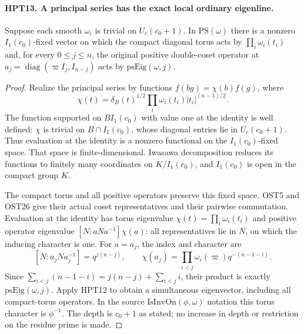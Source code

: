 \paragraph{HPT13. A principal series has the exact local ordinary eigenline.}
\label{claim:HPT13}
Suppose each smooth $\omega_i$ is trivial on $U_c(c_0+1)$.
In $\mathrm{PS}(\omega)$ there is a nonzero $I_1(c_0)$-fixed
vector on which the compact diagonal torus acts by
$\prod_i\omega_i(t_i)$ and, for every $0\leq j\leq n$,
the original positive double-coset operator at
$a_j=\operatorname{diag}(\varpi I_j,I_{n-j})$ acts by
$\mathrm{psEig}(\omega,j)$.
\begin{proof}
Realize the principal series by functions $f(bg)=\chi(b)f(g)$,
where
\[
       \chi(t)=\delta_B(t)^{1/2}\prod_i\omega_i(t_i)|t_i|^{(n-1)/2}.
\]
The function supported on $BI_1(c_0)$ with value one at the
identity is well defined: $\chi$ is trivial on $B\cap I_1(c_0)$,
whose diagonal entries lie in $U_c(c_0+1)$.  Thus evaluation at
the identity is a nonzero functional on the $I_1(c_0)$-fixed
space.  That space is finite-dimensional.  Iwasawa decomposition
reduces its functions to finitely many coordinates on
$K/I_1(c_0)$, and $I_1(c_0)$ is open in the compact group $K$.

The compact torus and all positive operators preserve this fixed
space.  OST5 and OST26 give their actual coset representatives
and their pairwise commutation.  Evaluation at the identity has
torus eigenvalue $\chi(t)=\prod_i\omega_i(t_i)$ and positive
operator eigenvalue $[N:aNa^{-1}]\chi(a)$: all representatives
lie in $N$, on which the inducing character is one.
For $a=a_j$, the index and character are
\[
 [N:a_jNa_j^{-1}]=q^{j(n-j)},\qquad
 \chi(a_j)=\prod_{i<j}\omega_i(\varpi)q^{-(n-1-i)}.
\]
Since $\sum_{i<j}(n-1-i)=j(n-j)+\sum_{i<j}i$, their product is
exactly $\mathrm{psEig}(\omega,j)$.  Apply HPT12 to obtain a
simultaneous eigenvector, including all compact-torus operators.
In the source $\mathrm{IsInvOn}(\phi,\omega)$ notation this
torus character is $\phi^{-1}$.  The depth is $c_0+1$ as stated;
no increase in depth or restriction on the residue prime is made.
\end{proof}

